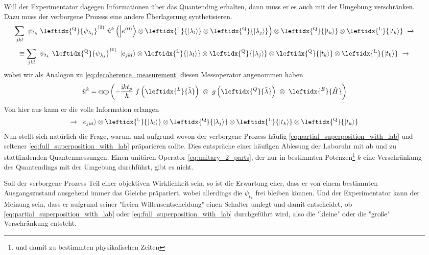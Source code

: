 \documentclass[12pt]{article}
\begin{document}
Will der Experimentator dagegen Informationen über das Quantending erhalten, dann muss er es auch mit der Umgebung verschränken. Dazu muss der verborgene Prozess eine andere Überlagerung synthetisieren.
\begin{equation*}
\sum_{jkl} \ \psi_{t_k}\ \leftidx{^\mathrm{Q}}{\psi_{\lambda_j}}^{(0)}\ 
\hat{u}^k \left( \ket{e^{(0)}} \otimes \leftidx{^\mathrm{L}}{\ket{\lambda_l}} 
\otimes \leftidx{^\mathrm{Q}}{\ket{\lambda_j}} \right) 
\otimes \leftidx{^\mathrm{Q}}{\ket{t_k}}
\otimes \leftidx{^\mathrm{L}}{\ket{t_k}}
\ \xrightarrow{}
\end{equation*}
\begin{equation}
\label{eq:full_superposition_with_lab}
\equiv \sum_{jkl} \ \psi_{t_k}\ \leftidx{^\mathrm{Q}}{\psi_{\lambda_j}}^{(0)}\ 
\ket{e_{jkl}} \otimes \leftidx{^\mathrm{L}}{\ket{\lambda_l}} 
\otimes \leftidx{^\mathrm{Q}}{\ket{\lambda_j}}
\otimes \leftidx{^\mathrm{Q}}{\ket{t_k}}
\otimes \leftidx{^\mathrm{L}}{\ket{t_k}}
\ \xrightarrow{}
\end{equation}
wobei wir als Analogon zu \eqref{eq:decoherence_measurement} diesen Messoperator angenommen haben
\begin{equation*}
\hat{u}^k = \mathrm{exp}\left(
-\frac{\mathrm{i}k t_p}{\hbar}\ f\left(\leftidx{^L}{\hat{\lambda}}\right)\ \otimes\  g\left(\leftidx{^Q}{\hat{\lambda}}\right)\ \otimes\ \leftidx{^E}{\hat{H}}
\right)
\end{equation*}
Von hier aus kann er die volle Information erlangen
\begin{equation*}
\xrightarrow{}\ \ket{e_{jkl}} 
\otimes \leftidx{^\mathrm{L}}{\ket{\lambda_l}} 
\otimes \leftidx{^\mathrm{Q}}{\ket{\lambda_j}}
\otimes \leftidx{^\mathrm{L}}{\ket{t_k}}
\otimes \leftidx{^\mathrm{Q}}{\ket{t_k}}
\end{equation*}
Nun stellt sich natürlich die Frage, warum und aufgrund wovon der verborgene Prozess häufig \eqref{eq:partial_superposition_with_lab} und seltener \eqref{eq:full_superposition_with_lab} präparieren sollte. Dies entspräche einer häufigen Ablesung der Laboruhr mit ab und zu stattfindenden Quantenmessungen. Einen unitären Operator \eqref{eq:unitary_2_parts}, der nur in bestimmten Potenzen\footnote{und damit zu bestimmten physikalischen Zeiten} $k$ eine Verschränkung des Quantendings mit der Umgebung durchführt, gibt es nicht.

Soll der verborgene Prozess Teil einer objektiven Wirklichkeit sein, so ist die Erwartung eher, dass er von einem bestimmten Ausgangszustand ausgehend immer das Gleiche präpariert, wobei allerdings die $\psi_{t_k}$ frei bleiben können. Und der Experimentator kann der Meinung sein, dass er aufgrund seiner "freien Willensentscheidung" einen Schalter umlegt und damit entscheidet, ob \eqref{eq:partial_superposition_with_lab} oder \eqref{eq:full_superposition_with_lab} durchgeführt wird, also die "kleine" oder die "große" Verschränkung entsteht.
\end{document}
